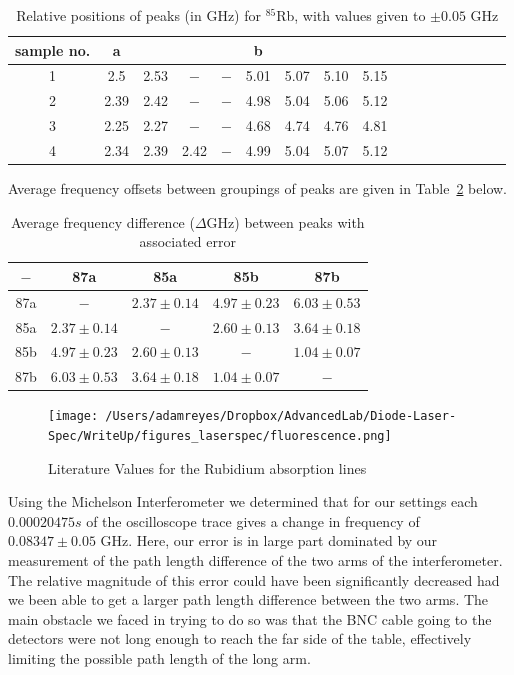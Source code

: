 \documentclass[paper=a4, fontsize=11pt]{scrartcl} %
\numberwithin{equation}{section}
\numberwithin{figure}{section}
\numberwithin{table}{section}
\begin{document}
\begin{table}[H]
\centering
\caption{Relative positions of peaks (in GHz) for $^{85}$Rb, with values given to $\pm 0.05$ GHz}
\begin{tabular}{ c | c c c c | c c c c | c c c c | c c c c }
  \hline
  \hline
  sample no. & a & & & & b  \\
  \hline
  1 & 2.5 & 2.53 & $-$ & $-$ & 5.01 & 5.07 & 5.10 & 5.15 \\
  2 & 2.39 & 2.42 & $-$ & $-$ & 4.98 & 5.04 & 5.06 & 5.12 \\
  3 & 2.25 & 2.27 & $-$ & $-$ & 4.68 & 4.74 & 4.76 & 4.81 \\
  4 & 2.34 & 2.39 & 2.42 & $-$ & 4.99 & 5.04 & 5.07 & 5.12 
\end{tabular}
\label{table:relativePositions85}
\end{table}

Average frequency offsets between groupings of peaks are given in Table~\ref{table:freqOffset} below.

\begin{table}[H]
\centering
\caption{Average frequency difference ($\Delta$GHz) between peaks with associated error}
\begin{tabular}{ || c | c c c c || }
  \hline
  \hline
   $-$ & 87a & 85a & 85b & 87b \\
  \hline
  87a & $-$ & $2.37 \pm 0.14$ & $4.97 \pm 0.23$ & $6.03 \pm 0.53$ \\
  85a & $2.37 \pm 0.14$ & $-$ & $2.60 \pm 0.13$ & $3.64 \pm 0.18$ \\
  85b & $4.97 \pm 0.23$ & $2.60 \pm 0.13$ & $-$ &  $1.04 \pm 0.07$ \\
  87b & $6.03 \pm 0.53$ & $3.64 \pm 0.18$ & $1.04 \pm 0.07$ & $-$  \\
  \hline
  \hline
\end{tabular}
\label{table:freqOffset}
\end{table}

\begin{figure}[h]
  \centering
  \texttt{[image: /Users/adamreyes/Dropbox/AdvancedLab/Diode-Laser-Spec/WriteUp/figures\_laserspec/fluorescence.png]}
  \caption{Literature Values for the Rubidium absorption lines\cite{vanier}\cite{harvard}}
  \label{fig:literature}
\end{figure}

Using the Michelson Interferometer we determined that for our settings
each $0.00020475s$ of the oscilloscope trace gives a change in
frequency of $0.08347 \pm 0.05$ GHz. Here, our error is in large part
dominated by our measurement of the path length difference of the two
arms of the interferometer. The relative magnitude of this error could
have been significantly decreased had we been able to get a larger
path length difference between the two arms. The main obstacle we
faced in trying to do so was that the BNC cable going to the detectors
were not long enough to reach the far side of the table, effectively
limiting the possible path length of the long arm. \\
\end{document}
